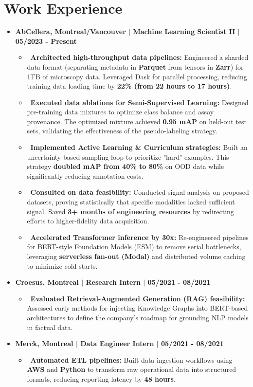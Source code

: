 \documentclass[letterpaper,10pt]{article}
\newcommand{\resumeItem}[1]{\item\small{#1}}
\newcommand{\resumeSubheading}[4]{
  \vspace{-1pt}
  \item \textbf{#1, #2 $|$ #3 $|$ #4}
}
\newcommand{\resumeSubHeadingList}{\begin{itemize}[leftmargin=0.15in, label={}]}
\newcommand{\resumeSubHeadingListEnd}{\end{itemize}}
\begin{document}
\section{Work Experience}
\resumeSubHeadingList
  \resumeSubheading
      {AbCellera}{Montreal/Vancouver}{Machine Learning Scientist II}{05/2023 - Present}
      \resumeSubHeadingList
          \resumeItem{\textbullet\ \textbf{Architected high-throughput data pipelines:} Engineered a sharded data format (separating metadata in \textbf{Parquet} from tensors in \textbf{Zarr}) for 1TB of microscopy data. Leveraged Dask for parallel processing, reducing training data loading time by \textbf{22\% (from 22 hours to 17 hours)}.}
          \resumeItem{\textbullet\ \textbf{Executed data ablations for Semi-Supervised Learning:} Designed pre-training data mixtures to optimize class balance and assay provenance. The optimized mixture achieved \textbf{0.95 mAP} on held-out test sets, validating the effectiveness of the pseudo-labeling strategy.}
          \resumeItem{\textbullet\ \textbf{Implemented Active Learning \& Curriculum strategies:} Built an uncertainty-based sampling loop to prioritize "hard" examples. This strategy \textbf{doubled mAP from 40\% to 80\%} on OOD data while significantly reducing annotation costs.}
          \resumeItem{\textbullet\ \textbf{Consulted on data feasibility:} Conducted signal analysis on proposed datasets, proving statistically that specific modalities lacked sufficient signal. Saved \textbf{3+ months of engineering resources} by redirecting efforts to higher-fidelity data acquisition.}
          \resumeItem{\textbullet\ \textbf{Accelerated Transformer inference by 30x:} Re-engineered pipelines for BERT-style Foundation Models (ESM) to remove serial bottlenecks, leveraging \textbf{serverless fan-out (Modal)} and distributed volume caching to minimize cold starts.}
      \resumeSubHeadingListEnd

  \resumeSubheading
      {Croesus}{Montreal}{Research Intern}{05/2021 - 08/2021}
      \resumeSubHeadingList
          \resumeItem{\textbullet\ \textbf{Evaluated Retrieval-Augmented Generation (RAG) feasibility:} Assessed early methods for injecting Knowledge Graphs into BERT-based architectures to define the company's roadmap for grounding NLP models in factual data.}
      \resumeSubHeadingListEnd

  \resumeSubheading
      {Merck}{Montreal}{Data Engineer Intern}{05/2021 - 08/2021}
      \resumeSubHeadingList
          \resumeItem{\textbullet\ \textbf{Automated ETL pipelines:} Built data ingestion workflows using \textbf{AWS} and \textbf{Python} to transform raw operational data into structured formats, reducing reporting latency by \textbf{48 hours}.}
      \resumeSubHeadingListEnd
\resumeSubHeadingListEnd
\end{document}
